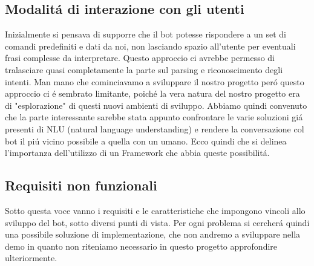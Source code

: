 \documentclass[]{article}
\begin{document}
\subsection{Modalitá di interazione con gli utenti}
Inizialmente si pensava di supporre che il bot potesse rispondere a un set di comandi predefiniti e dati da noi, non lasciando spazio all’utente per eventuali frasi complesse da interpretare. Questo approccio ci avrebbe permesso di tralasciare quasi completamente la parte sul parsing e riconoscimento degli intenti. Man mano che cominciavamo a sviluppare il nostro progetto peró questo approccio ci é sembrato limitante, poiché la vera natura del nostro progetto era di "esplorazione" di questi nuovi ambienti di sviluppo. Abbiamo quindi convenuto che la parte interessante sarebbe stata appunto confrontare le varie soluzioni giá presenti di NLU (natural language understanding) e rendere la conversazione col bot il piú vicino possibile a quella con un umano. Ecco quindi che si delinea l'importanza dell'utilizzo di un Framework che abbia queste possibilitá.

\subsection{Requisiti non funzionali}
Sotto questa voce vanno i requisiti e le caratteristiche che impongono vincoli  allo sviluppo del bot, sotto diversi punti di vista. Per ogni problema si cercherá quindi una possibile soluzione di implementazione, che non andremo a sviluppare nella demo in quanto non riteniamo necessario in questo progetto approfondire ulteriormente.
\end{document}
